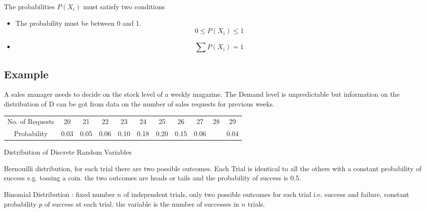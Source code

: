 

The probabilities  $P(X_i)$ must satisfy two conditions
\begin{itemize}

\item The probability must be between 0 and 1.
\[ 0 \leq P(X_i) \leq 1 \]

\item
\[ \sum P(X_i) = 1\]
\end{itemize}

\subsection{Example}
A sales manager needs to decide on the stock level of a weekly magazine. The Demand level is
unpredictable but information on the distribution of D can be got from data on the number of sales requests for previous weeks.
\begin{center}
\begin{tabular}{|cccccc|ccccc|}
No. of Requests & 20 & 21 & 22 & 23 & 24 & 25 & 26 & 27 & 28 & 29 \\ 
Probability & 0.03 & 0.05 & 0.06 & 0.10 & 0.18 & 0.20 & 0.15 & 0.06 &  & 0.04 \\ 
\end{tabular}
\end{center}
Distribution of Discrete Random Variables

Bernouilli distribution, for each trial there are two possible outcomes. Each Trial is identical to all the others
with a constant probability of success e.g. tossing a coin. the two outcomes are heads or tails and the probability of success is 0.5.

Binomial Distribution : fixed number $n$ of independent trials, only two possible outcomes for each trial i.e. success and failure, constant probability $p$ of success at each trial.
the variable is the number of successes in $n$ trials.
